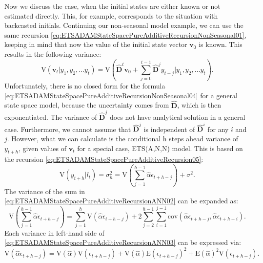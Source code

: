\documentclass[
]{book}
\theoremstyle{definition}
\theoremstyle{definition}
\theoremstyle{definition}
\theoremstyle{definition}
\theoremstyle{remark}
\begin{document}
Now we discuss the case, when the initial states are either known or not estimated directly. This, for example, corresponds to the situation with backcasted initials. Continuing our non-seasonal model example, we can use the same recursion \eqref{eq:ETSADAMStateSpacePureAdditiveRecursionNonSeasonal01}, keeping in mind that now the value of the initial state vector \(\mathbf{v}_0\) is known. This results in the following variance:
\begin{equation}
    \mathrm{V}(\mathbf{v}_{t} | y_1, y_2, \dots y_t) = \mathrm{V}\left( \hat{\mathbf{D}}^{t} \mathbf{v}_{0} + \sum_{j=0}^{t-1} \hat{\mathbf{D}}^{j} y_{t - j} | y_1, y_2, \dots y_t \right) .
  \label{eq:ETSADAMStateSpacePureAdditiveRecursionNonSeasonal04}
\end{equation}
Unfortunately, there is no closed form for the formula \eqref{eq:ETSADAMStateSpacePureAdditiveRecursionNonSeasonal04} for a general state space model, because the uncertainty comes from \(\hat{\mathbf{D}}\), which is then exponentiated. The variance of \(\hat{\mathbf{D}}^{j}\) does not have analytical solution in a general case. Furthermore, we cannot assume that \(\hat{\mathbf{D}}^{j}\) is independent of \(\hat{\mathbf{D}}^{i}\) for any \(i\) and \(j\). However, what we can calculate is the conditional h steps ahead variance of \(y_{t+h}\), given values of \(\mathbf{v}_t\) for a special case, ETS(A,N,N) model. This is based on the recursion \eqref{eq:ETSADAMStateSpacePureAdditiveRecursion05}:
\begin{equation}
    \mathrm{V}(y_{t+h} | l_t) = \sigma^2_h = \mathrm{V} \left(\sum_{j=1}^{h-1} \hat{\alpha} \epsilon_{t+h-j} \right) + \sigma^2.
  \label{eq:ETSADAMStateSpacePureAdditiveRecursionANN02}
\end{equation}
The variance of the sum in \eqref{eq:ETSADAMStateSpacePureAdditiveRecursionANN02} can be expanded as:
\begin{equation}
    \mathrm{V} \left(\sum_{j=1}^{h-1} \hat{\alpha} \epsilon_{t+h-j} \right) = \sum_{j=1}^h \mathrm{V} \left(\hat{\alpha} \epsilon_{t+h-j}\right) + 2 \sum_{j=2}^{h-1} \sum_{i=1}^{j-1} \mathrm{cov}(\hat{\alpha} \epsilon_{t+h-j},\hat{\alpha} \epsilon_{t+h-i}).
  \label{eq:ETSADAMStateSpacePureAdditiveRecursionANN03}
\end{equation}
Each variance in left-hand side of \eqref{eq:ETSADAMStateSpacePureAdditiveRecursionANN03} can be expressed via:
\begin{equation}
    \mathrm{V} \left(\hat{\alpha} \epsilon_{t+h-j}\right) = \mathrm{V} (\hat{\alpha}) \mathrm{V}(\epsilon_{t+h-j}) + \mathrm{V} (\hat{\alpha}) \mathrm{E}(\epsilon_{t+h-j})^2 + \mathrm{E} (\hat{\alpha})^2 \mathrm{V}(\epsilon_{t+h-j}).
  \label{eq:ETSADAMStateSpacePureAdditiveRecursionANN04}
\end{equation}
\end{document}
